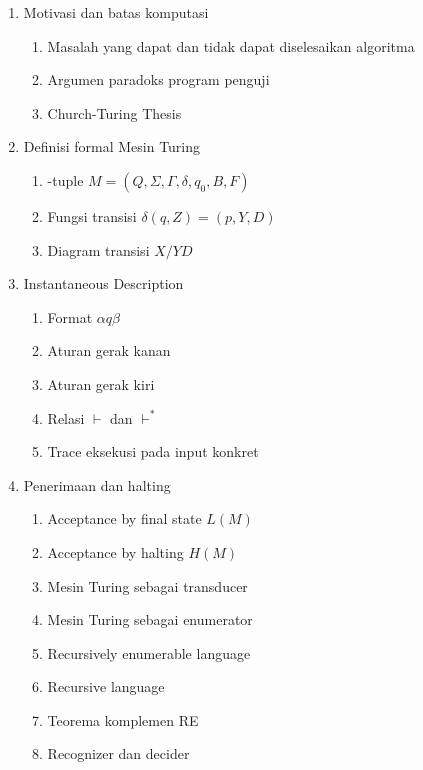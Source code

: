 \begin{enumerate}
    \item \pwajib Motivasi dan batas komputasi
    \begin{enumerate}
        \item \pwajib Masalah yang dapat dan tidak dapat diselesaikan algoritma
        \item \ppaham Argumen paradoks program penguji
        \item \pwajib Church-Turing Thesis
    \end{enumerate}
    \item \pwajib Definisi formal Mesin Turing
    \begin{enumerate}
        \item {}-tuple $M=(Q,\Sigma,\Gamma,\delta,q_0,B,F)$
        \item \pwajib Fungsi transisi $\delta(q,Z)=(p,Y,D)$
        \item \ppaham Diagram transisi $X/YD$
    \end{enumerate}
    \item \pwajib Instantaneous Description
    \begin{enumerate}
        \item \pwajib Format $\alpha q\beta$
        \item \pwajib Aturan gerak kanan
        \item \pwajib Aturan gerak kiri
        \item \pwajib Relasi $\vdash$ dan $\vdash^*$
        \item \pwajib Trace eksekusi pada input konkret
    \end{enumerate}
    \item \pwajib Penerimaan dan halting
    \begin{enumerate}
        \item \pwajib Acceptance by final state $L(M)$
        \item \pwajib Acceptance by halting $H(M)$
        \item \ppaham Mesin Turing sebagai transducer
        \item \ppaham Mesin Turing sebagai enumerator
        \item \pwajib Recursively enumerable language
        \item \pwajib Recursive language
        \item \pwajib Teorema komplemen RE
        \item \ppaham Recognizer dan decider
    \end{enumerate}

\end{enumerate}
